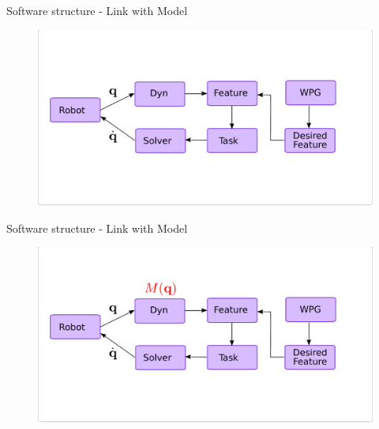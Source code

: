 \begin{frame}{Software structure - Link with Model}
  \begin{figure}
    \includegraphics[width=\linewidth]{./figures/Concept-Theory-Fig-Finalv2M5}
  \end{figure}
\end{frame}

    
 



\begin{frame}{Software structure - Link with Model}
  \begin{figure}
    \includegraphics[width=\linewidth]{./figures/Concept-Theory-Fig-Finalv2M4}
  \end{figure}
\end{frame}

